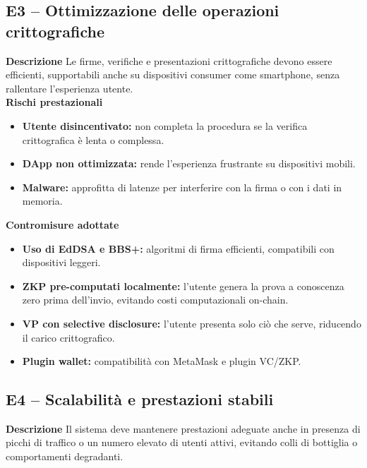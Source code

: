         \subsection{E3 – Ottimizzazione delle operazioni crittografiche}
            \noindent \textbf{Descrizione}
                Le firme, verifiche e presentazioni crittografiche devono essere efficienti, supportabili anche su dispositivi consumer come smartphone, senza rallentare l'esperienza utente. \\

            \noindent \textbf{Rischi prestazionali}
                \begin{itemize}
                    \item \textbf{Utente disincentivato:} non completa la procedura se la verifica crittografica è lenta o complessa.

                    \item \textbf{DApp non ottimizzata:} rende l'esperienza frustrante su dispositivi mobili.

                    \item \textbf{Malware:} approfitta di latenze per interferire con la firma o con i dati in memoria.
                \end{itemize}

            \noindent \textbf{Contromisure adottate}
                \begin{itemize}
                    \item \textbf{Uso di EdDSA e BBS+:} algoritmi di firma efficienti, compatibili con dispositivi leggeri.

                    \item \textbf{ZKP pre-computati localmente:} l'utente genera la prova a conoscenza zero prima dell'invio, evitando costi computazionali on-chain.

                    \item \textbf{VP con selective disclosure:} l'utente presenta solo ciò che serve, riducendo il carico crittografico.

                    \item \textbf{Plugin wallet:} compatibilità con MetaMask e plugin VC/ZKP.
                \end{itemize}

        \subsection{E4 – Scalabilità e prestazioni stabili}
            \noindent \textbf{Descrizione}
                Il sistema deve mantenere prestazioni adeguate anche in presenza di picchi di traffico o un numero elevato di utenti attivi, evitando colli di bottiglia o comportamenti degradanti. \\

